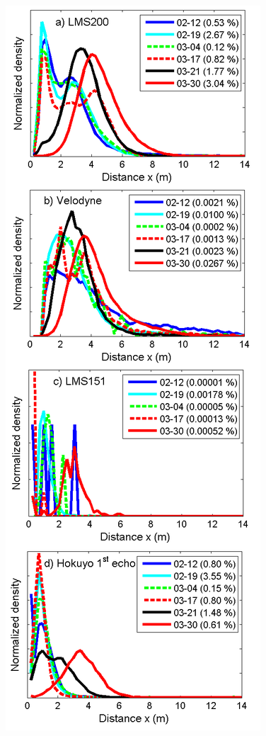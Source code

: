 
\begin{figure}[th]
    \centering
    \includegraphics[width=0.80\linewidth]{./img/Histograms.png}

\end{figure}
